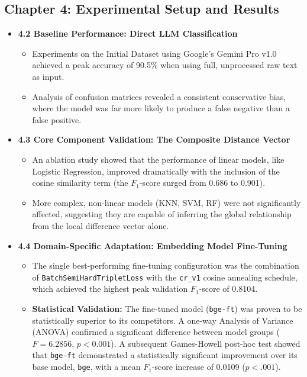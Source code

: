\documentclass[11pt]{article}
\begin{document}
\subsection*{Chapter 4: Experimental Setup and Results}
\begin{itemize}
    \item \textbf{4.2 Baseline Performance: Direct LLM Classification}
    \begin{itemize}
        \item Experiments on the Initial Dataset using Google's Gemini Pro v1.0 achieved a peak accuracy of 90.5\% when using full, unprocessed raw text as input.
        \item Analysis of confusion matrices revealed a consistent conservative bias, where the model was far more likely to produce a false negative than a false positive.
    \end{itemize}
    \item \textbf{4.3 Core Component Validation: The Composite Distance Vector}
    \begin{itemize}
        \item An ablation study showed that the performance of linear models, like Logistic Regression, improved dramatically with the inclusion of the cosine similarity term (the $F_{1}$-score surged from 0.686 to 0.901).
        \item More complex, non-linear models (KNN, SVM, RF) were not significantly affected, suggesting they are capable of inferring the global relationship from the local difference vector alone.
    \end{itemize}
    \item \textbf{4.4 Domain-Specific Adaptation: Embedding Model Fine-Tuning}
    \begin{itemize}
        \item The single best-performing fine-tuning configuration was the combination of \texttt{BatchSemiHardTripletLoss} with the \texttt{cr\_v1} cosine annealing schedule, which achieved the highest peak validation $F_{1}$-score of 0.8104.
        \item \textbf{Statistical Validation:} The fine-tuned model (\texttt{bge-ft}) was proven to be statistically superior to its competitors. A one-way Analysis of Variance (ANOVA) confirmed a significant difference between model groups ($F=6.2856$, $p<0.001$). A subsequent Games-Howell post-hoc test showed that \texttt{bge-ft} demonstrated a statistically significant improvement over its base model, \texttt{bge}, with a mean $F_{1}$-score increase of 0.0109 ($p<.001$).

\end{itemize}
\end{itemize}
\end{document}
